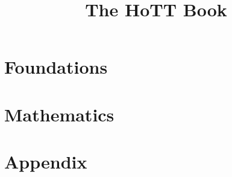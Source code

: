 \documentclass[openany,11pt]{book}
\renewcommand{\markboth}[2]{}
\renewcommand{\chaptermark}[1]{\markboth{\textsc{Chapter \thechapter. #1}}{}}
\renewcommand{\sectionmark}[1]{\markright{\textsc{\thesection\ #1}}}
\begin{document}
\title{The HoTT Book}

\frontmatter

\cleartooddpage{}

\setcounter{tocdepth}{1}        %
\tableofcontents
\setcounter{tocdepth}{2}        %
\cleartooddpage{\thispagestyle{empty}}

\mainmatter



\part{Foundations}
\label{part:foundations}





%









\part{Mathematics}
\label{part:mathematics}









\part{Appendix}

\appendix
\renewcommand{\chaptermark}[1]{\markboth{\textsc{Appendix \thechapter. #1}}{}}
\renewcommand{\sectionmark}[1]{\markright{\textsc{\thesection\ #1}}}






\backmatter{}





\end{document}
